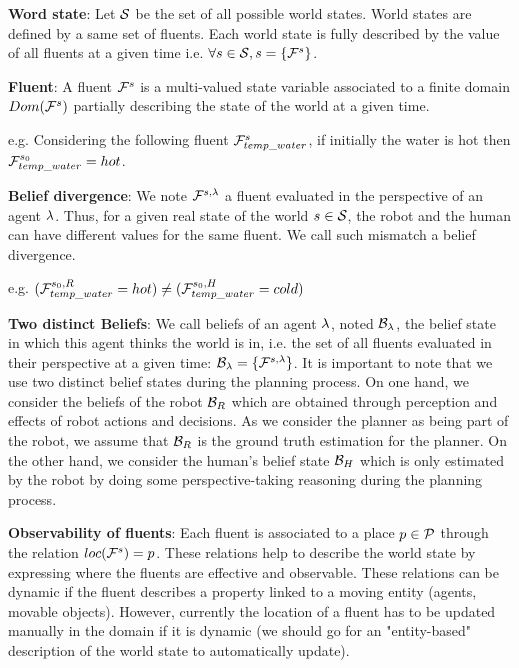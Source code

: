 \documentclass[letterpaper]{article} %
\begin{document}
\textbf{Word state}: 
Let $\mathcal{S}$ be the set of all possible world states. World states are defined by a same set of fluents. Each world state is fully described by the value of all fluents at a given time i.e. $\forall s\in\mathcal{S}, s=\{ \mathcal{F}^{s}_{} \}$.

\textbf{Fluent}: 
A fluent $\mathcal{F}^{s}_{}$ is a multi-valued state variable associated to a finite domain $Dom(\mathcal{F}^{s}_{})$ partially describing the state of the world at a given time.

e.g. Considering the following fluent $\mathcal{F}^{s}_{temp\_water}$, if initially the water is hot then $\mathcal{F}^{s_0}_{temp\_water}=hot$.



\textbf{Belief divergence}: 
We note $\mathcal{F}^{s,\lambda}_{}$ a fluent evaluated in the perspective of an agent $\lambda$. Thus, for a given real state of the world $s\in\mathcal{S}$, the robot and the human can have different values for the same fluent. We call such mismatch a belief divergence.

e.g. $(\mathcal{F}^{s_0,R}_{temp\_water}=hot) \neq (\mathcal{F}^{s_0,H}_{temp\_water}=cold)$

\textbf{Two distinct Beliefs}: 
We call beliefs of an agent $\lambda$, noted $\mathcal{B}_\lambda$, the belief state in which this agent thinks the world is in, i.e. the set of all fluents evaluated in their perspective at a given time: $\mathcal{B}_\lambda=\{ \mathcal{F}^{s,\lambda}_{} \}$. It is important to note that we use two distinct belief states during the planning process. On one hand, we consider the beliefs of the robot $\mathcal{B}_R$ which are obtained through perception and effects of robot actions and decisions. As we consider the planner as being part of the robot, we assume that $\mathcal{B}_R$ is the ground truth estimation for the planner. On the other hand, we consider the human's belief state $\mathcal{B}_H$ which is only estimated by the robot by doing some perspective-taking reasoning during the planning process.

\textbf{Observability of fluents}:
Each fluent is associated to a place $p \in \mathcal{P}$ through the relation $loc( \mathcal{F}^{s}_{} )=p$. These relations help to describe the world state by expressing where the fluents are effective and observable. These relations can be dynamic if the fluent describes a property linked to a moving entity (agents, movable objects). However, currently the location of a fluent has to be updated manually in the domain if it is dynamic (we should go for an "entity-based" description of the world state to automatically update).
\end{document}
